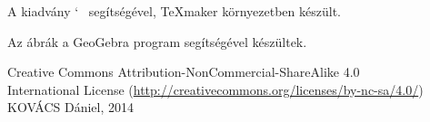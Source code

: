 
\newpage
\thispagestyle{empty}
\null\vfill
\begin{center}
  A kiadv\'{a}ny \AmS{}`~\LaTeXe{} seg\'{i}ts\'{e}g\'{e}vel, \TeX{}maker
  k\"{o}rnyezetben k\'{e}sz\"{u}lt.
	
  Az \'{a}br\'{a}k a GeoGebra program seg\'{i}ts\'{e}g\'{e}vel
  k\'{e}sz\"{u}ltek.\\[4ex]	
	
  {\Large\cc\byncsa}
  
  Creative Commons Attribution-NonCommercial-ShareAlike 4.0\\
  International License
  (\url{http://creativecommons.org/licenses/by-nc-sa/4.0/})\\[4ex]
  
  KOV\'{A}CS D\'{a}niel, 2014
\end{center} 